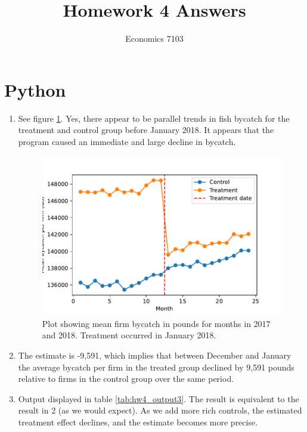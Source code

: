 \documentclass{article}
\title{Homework 4 Answers}
\author{Economics 7103}
\begin{document}
  
\maketitle

\section{Python}

\begin{enumerate}
\item See figure \ref{fig:hw4_q1}.  Yes, there appear to be parallel trends in fish bycatch for the treatment and control group before January 2018.  It appears that the program caused an immediate and large decline in bycatch.
\begin{figure}[h]
    \centering
    \includegraphics[scale = 0.7]{hw4_q1.pdf}
    \caption{Plot showing mean firm bycatch in pounds for months in 2017 and 2018.  Treatment occurred in January 2018.}
    \label{fig:hw4_q1}
\end{figure}
\item The estimate is -9,591, which implies that between December and January the average bycatch per firm in the treated group declined by 9,591 pounds relative to firms in the control group over the same period.
\item Output displayed in table \ref{tab:hw4_output3}.  The result is equivalent to the result in 2 (as we would expect).  As we add more rich controls, the estimated treatment effect declines, and the estimate becomes more precise.
\end{enumerate}


\end{document}
